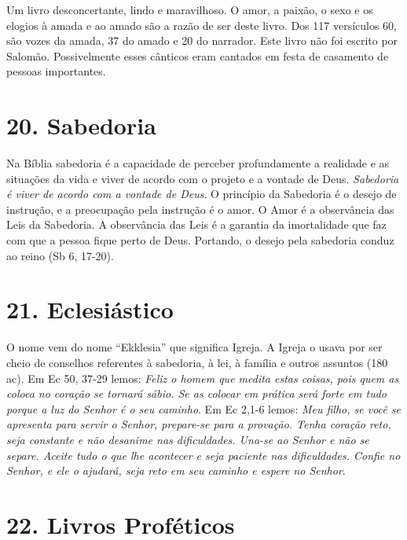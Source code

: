 \documentclass[
]{book}
\begin{document}
Um livro desconcertante, lindo e maravilhoso. O amor, a paixão, o sexo e os elogios à amada e ao amado são a razão de ser deste livro. Dos 117 versículos 60, são vozes da amada, 37 do amado e 20 do narrador. Este livro não foi escrito por Salomão. Possivelmente esses cânticos eram cantados em festa de casamento de pessoas importantes.

\hypertarget{sabedoria}{%
\section*{20. Sabedoria}\label{sabedoria}}

Na Bíblia sabedoria é a capacidade de perceber profundamente a realidade e as situações da vida e viver de acordo com o projeto e a vontade de Deus. \emph{Sabedoria é viver de acordo com a vontade de Deus}. O princípio da Sabedoria é o desejo de instrução, e a preocupação pela instrução é o amor. O Amor é a observância das Leis da Sabedoria. A observância das Leis é a garantia da imortalidade que faz com que a pessoa fique perto de Deus. Portando, o desejo pela sabedoria conduz ao reino (Sb 6, 17-20).

\hypertarget{eclesiuxe1stico}{%
\section*{21. Eclesiástico}\label{eclesiuxe1stico}}

O nome vem do nome ``Ekklesia'' que significa Igreja. A Igreja o usava por ser cheio de conselhos referentes à sabedoria, à lei, à família e outros assuntos (180 ac). Em Ec 50, 37-29 lemos: \emph{Feliz o homem que medita estas coisas, pois quem as coloca no coração se tornará sábio. Se as colocar em prática será forte em tudo porque a luz do Senhor é o seu caminho}. Em Ec 2,1-6 lemos: \emph{Meu filho, se você se apresenta para servir o Senhor, prepare-se para a provação. Tenha coração reto, seja constante e não desanime nas dificuldades. Una-se ao Senhor e não se separe. Aceite tudo o que lhe acontecer e seja paciente nas dificuldades. Confie no Senhor, e ele o ajudará, seja reto em seu caminho e espere no Senhor}.

\hypertarget{livros-profuxe9ticos}{%
\section*{22. Livros Proféticos}\label{livros-profuxe9ticos}}
\end{document}

